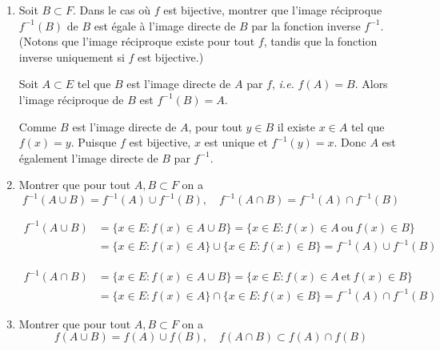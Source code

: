 \documentclass[a4paper, 10pt]{report}
\begin{document}
	\begin{enumerate}[label=(\roman*)]
		\item Soit $B \subset F$. Dans le cas où $f$ est bijective,
		montrer que l'image réciproque $f^{-1}(B)$ de $B$ est égale
		à l'image directe de $B$ par la fonction inverse $f^{-1}$.
		(Notons que l'image réciproque existe pour tout $f$, tandis
		que la fonction inverse uniquement si $f$ est bijective.)
		
		\colorbox{solution}
		{
			\begin{minipage}{0.9\textwidth}
				Soit $A \subset E$ tel que $B$ est l'image directe de
				$A$ par $f$, \textit{i.e.} $f(A) = B$. Alors l'image
				réciproque de $B$ est $f^{-1}(B) = A$.
				
				Comme $B$ est l'image directe de $A$, pour tout
				$y \in B$ il existe $x \in A$ tel que $f(x) = y$.
				Puisque $f$ est bijective, $x$ est unique et
				$f^{-1}(y) = x$. Donc $A$ est également l'image
				directe de $B$ par $f^{-1}$.
			\end{minipage}
		}
		\item Montrer que pour tout $A, B \subset F$ on a
		\[
			f^{-1}(A \cup B) = f^{-1}(A) \cup f^{-1}(B), \quad
			f^{-1}(A \cap B) = f^{-1}(A) \cap f^{-1}(B)
		\]
		
		\colorbox{solution}
		{
			\begin{minipage}{0.9\textwidth}
				\[ \begin{split}
					f^{-1}(A \cup B) &= \{x \in E : f(x) \in A \cup B\}
					= \{x \in E : f(x) \in A \ \text{ou}\ f(x) \in B\}\\
					&= \{x \in E : f(x) \in A\}
						\cup \{x \in E : f(x) \in B\}
					= f^{-1}(A) \cup f^{-1}(B)
				\end{split}\]
				
				\[ \begin{split}
					f^{-1}(A \cap B) &= \{x \in E : f(x) \in A \cup B\}
					= \{x \in E : f(x) \in A \ \text{et}\ f(x) \in B\}\\
					&= \{x \in E : f(x) \in A\}
					\cap \{x \in E : f(x) \in B\}
					= f^{-1}(A) \cap f^{-1}(B)
				\end{split}\]
			\end{minipage}
		}
		\item Montrer que pour tout $A, B \subset F$ on a
		\[
		f(A \cup B) = f(A) \cup f(B), \quad
		f(A \cap B) \subset f(A) \cap f(B)
		\]
		

\end{enumerate}
\end{document}
